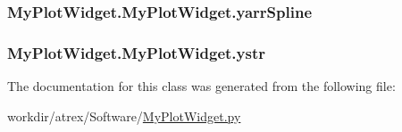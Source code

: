 \hypertarget{class_my_plot_widget_1_1_my_plot_widget_a2bcd4bfd7b9d5c75e58140845b87508d}{
\subsubsection[{yarr\-Spline}]{\setlength{\rightskip}{0pt plus 5cm}My\-Plot\-Widget.\-My\-Plot\-Widget.\-yarr\-Spline}}\label{class_my_plot_widget_1_1_my_plot_widget_a2bcd4bfd7b9d5c75e58140845b87508d}
\hypertarget{class_my_plot_widget_1_1_my_plot_widget_a1257bc7678d216ec50d9cafa6329c8a7}{
\subsubsection[{ystr}]{\setlength{\rightskip}{0pt plus 5cm}My\-Plot\-Widget.\-My\-Plot\-Widget.\-ystr}}\label{class_my_plot_widget_1_1_my_plot_widget_a1257bc7678d216ec50d9cafa6329c8a7}


The documentation for this class was generated from the following file\-:\begin{DoxyCompactItemize}
\item 
workdir/atrex/\-Software/\hyperlink{_my_plot_widget_8py}{My\-Plot\-Widget.\-py}\end{DoxyCompactItemize}

